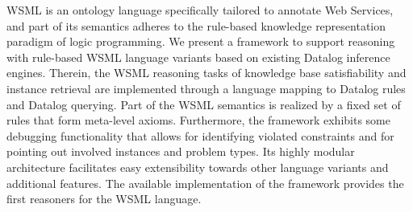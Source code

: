 WSML is an ontology language specifically tailored to annotate Web
Services, and part of its semantics adheres to the rule-based
knowledge representation paradigm of logic programming. We present a
framework to support reasoning with rule-based WSML language
variants based on existing Datalog inference engines. Therein, the
WSML reasoning tasks of knowledge base satisfiability and instance
retrieval are implemented through a language mapping to Datalog
rules and Datalog querying. Part of the WSML semantics is realized
by a fixed set of rules that form meta-level axioms. Furthermore,
the framework exhibits some debugging functionality that allows for
identifying violated constraints and for pointing out involved
instances and problem types. Its highly modular architecture
facilitates easy extensibility towards other language variants and
additional features. The available implementation of the framework
provides the first reasoners for the WSML language.
